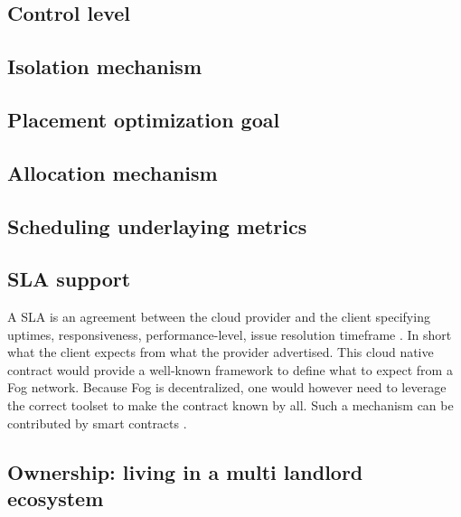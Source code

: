 \documentclass[11pt]{sdm}
\begin{document}
\subsection{Control level}

\subsection{Isolation mechanism}

\subsection{Placement optimization goal}

\subsection{Allocation mechanism}
\subsection{Scheduling underlaying metrics}

\hypersetup{linkcolor=}
\subsection{\acrfull{SLA} support}
A \acrfull{SLA} is an agreement between the cloud provider and the client specifying uptimes, responsiveness, performance-level, issue resolution timeframe \cite{wikipedia_service-level_2021}. In short what the client expects from what the provider advertised. This cloud native contract would provide a well-known framework to define what to expect from a Fog network. Because Fog is decentralized, one would however need to leverage the correct toolset to make the contract known by all. Such a mechanism can be contributed by smart contracts \cite{hang_sla-based_2019, di_pascale_smart_2017, zhou_trustworthy_2018}.
\subsection{Ownership: living in a multi landlord ecosystem}
\end{document}
